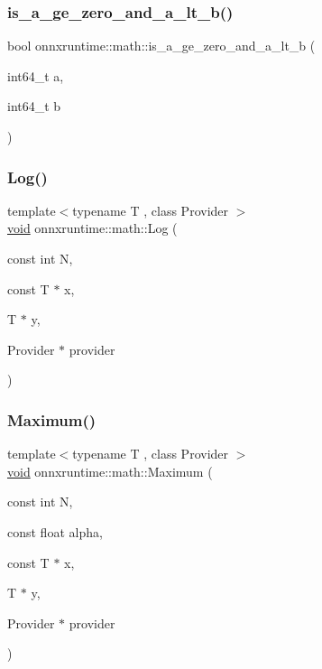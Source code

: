 \subsubsection{\texorpdfstring{is\+\_\+a\+\_\+ge\+\_\+zero\+\_\+and\+\_\+a\+\_\+lt\+\_\+b()}{is\_a\_ge\_zero\_and\_a\_lt\_b()}}
{\footnotesize\ttfamily bool onnxruntime\+::math\+::is\+\_\+a\+\_\+ge\+\_\+zero\+\_\+and\+\_\+a\+\_\+lt\+\_\+b (\begin{DoxyParamCaption}\item[{int64\+\_\+t}]{a,  }\item[{int64\+\_\+t}]{b }\end{DoxyParamCaption})\hspace{0.3cm}{\ttfamily [inline]}}

\mbox{\label{namespaceonnxruntime_1_1math_a4ef818f7b843cea1431240a6751d01a0}} 
\subsubsection{\texorpdfstring{Log()}{Log()}}
{\footnotesize\ttfamily template$<$typename T , class Provider $>$ \\
\mbox{\hyperlink{mlasi_8h_a88f941d423cb2a819b70a1358982b1a6}{void}} onnxruntime\+::math\+::\+Log (\begin{DoxyParamCaption}\item[{const int}]{N,  }\item[{const T $\ast$}]{x,  }\item[{T $\ast$}]{y,  }\item[{Provider $\ast$}]{provider }\end{DoxyParamCaption})}

\mbox{\label{namespaceonnxruntime_1_1math_a3b2c3754c68e1540d57d6dd2ad3c73ca}} 
\subsubsection{\texorpdfstring{Maximum()}{Maximum()}}
{\footnotesize\ttfamily template$<$typename T , class Provider $>$ \\
\mbox{\hyperlink{mlasi_8h_a88f941d423cb2a819b70a1358982b1a6}{void}} onnxruntime\+::math\+::\+Maximum (\begin{DoxyParamCaption}\item[{const int}]{N,  }\item[{const float}]{alpha,  }\item[{const T $\ast$}]{x,  }\item[{T $\ast$}]{y,  }\item[{Provider $\ast$}]{provider }\end{DoxyParamCaption})}


